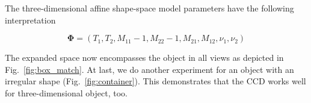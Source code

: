 The three-dimensional affine shape-space model parameters have
the following interpretation

\begin{equation}
  \label{eq:4.19}
  \mathbf{\Phi} =  (T_1, T_2, M_{11} - 1, M_{22} - 1, M_{21}, M_{12}, \nu_1, \nu_2)
\end{equation}

The expanded space now encompasses the object in all views as depicted
in Fig.~\ref{fig:box_match}. At last, we do
another experiment for an object with an irregular shape (Fig.~\ref{fig:container}). This
demonstrates that the CCD works well for three-dimensional object, too.

\begin{figure}[htbp] 
  \begin{minipage}[t]{0.5\linewidth} 
    \centering 
  \end{minipage}%
  \begin{minipage}[t]{0.5\linewidth} 
    \centering 
  \end{minipage} 
  \begin{minipage}[t]{0.5\linewidth} 
    \centering 

\end{minipage}
\end{figure}
